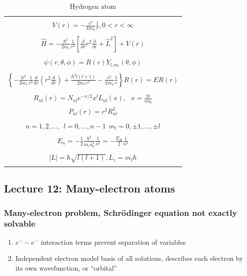 \documentclass[11pt]{article}
\begin{document}
\begin{table}[tbh]
   \begin{center}
   \caption{Hydrogen atom}
    \label{Hydrogen atom}
\begin{tabular}[h]{|c|}
\hline
 \\
$\displaystyle       V(r) = -\frac{e^2}{4\pi\epsilon_0}\frac{1}{r}, 0 < r< \infty$ \\
 \\
$\displaystyle     \hat H = -\frac{\hbar^2}{2m_e}\frac{1}{r^2}\left [
  \frac{\partial}{\partial r}r^2\frac{\partial}{\partial r} + \hat L^2 \right ] +V(r)$ \\
\\
$\displaystyle \psi(r,\theta,\phi) = R(r)Y_{l,m_l}(\theta,\phi) $ \\
\\
$\displaystyle   \left \{ -\frac{\hbar^2}{2m_e}\frac{1}{r^2}
            \frac{d}{d r} \left ( r^2 \frac{d}{dr}\right ) + \frac{\hbar^2
              l(l+1)}{2 m_e r^2}
          -\frac{e^2}{4\pi\epsilon_0}\frac{1}{r}\right \} R(r) = E R(r) $ \\
\\
$\displaystyle R_{nl}(r) = N_{nl} e^{-x/2} x^l L_{nl}(x),\ \ \  x = \frac{2 r}{n a_0} $
\\
$\displaystyle P_{nl}(r) = r^2 R_{nl}^2 $
\\
\\
$\displaystyle n = 1, 2, \ldots,\ \  l = 0, \ldots, n-1 \ \ m_l = 0,\pm 1, \ldots, \pm l$
\\
\\
$\displaystyle     E_{n}=-\frac{1}{2}\frac{\hbar^2}{m_e a_0^2}\frac{1}{n^2} =-\frac{E_H}{2}\frac{1}{n^2}$ \\
 \\
$\displaystyle |L| = \hbar \sqrt{l(l+1)}, L_z = m_l \hbar $ \\
\\
\hline
\end{tabular}
 \end{center}
\end{table}

\subsection{Lecture 12: Many-electron atoms}
\label{sec:org40a1453}
\subsubsection{Many-electron problem, Schr\"{o}dinger equation not exactly solvable}
\label{sec:org6026b70}
\begin{enumerate}
\item \(e^- -e^-\) interaction terms prevent separation of variables
\item Independent electron model basis of all solutions, describes each electron by its own wavefunction, or ``orbital''
\end{enumerate}
\end{document}

